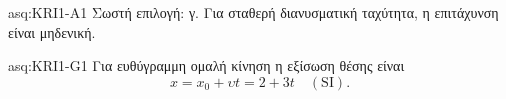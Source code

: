 \clearpage
\thispagestyle{plain}
\begin{AssessmentSolution}{asq:KRI1-A1}
Σωστή επιλογή: γ. Για σταθερή διανυσματική ταχύτητα, η επιτάχυνση
είναι μηδενική.
\end{AssessmentSolution}
\begin{AssessmentSolution}{asq:KRI1-G1}
Για ευθύγραμμη ομαλή κίνηση η εξίσωση θέσης είναι
\[
  x=x_0+\upsilon t=2+3t\quad (\mathrm{SI}).
\]
\end{AssessmentSolution}
